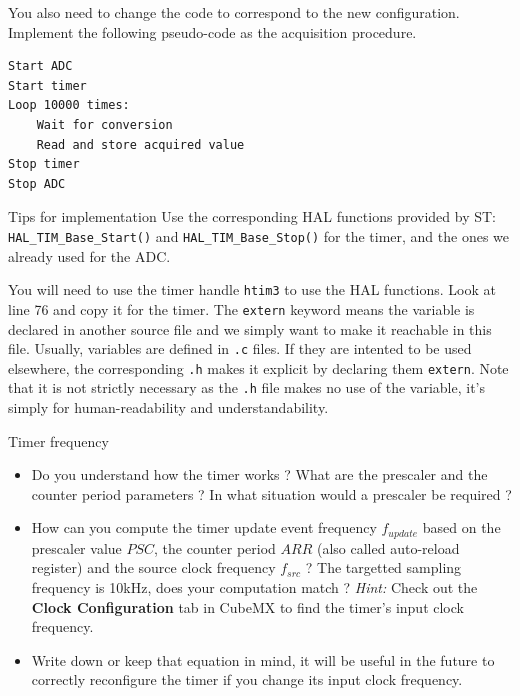 You also need to change the code to correspond to the new configuration. Implement the following pseudo-code as the acquisition procedure.
\begin{lstlisting}[columns=fullflexible]
Start ADC
Start timer
Loop 10000 times:
    Wait for conversion
    Read and store acquired value
Stop timer
Stop ADC
\end{lstlisting}

\begin{bclogo}[couleur = gray!20, arrondi = 0.2, logo=\bcattention]{Tips for implementation}
Use the corresponding HAL functions provided by ST:\\
\texttt{HAL\_TIM\_Base\_Start()} and \texttt{HAL\_TIM\_Base\_Stop()} for the timer, and the ones we already used for the ADC.

You will need to use the timer handle \texttt{htim3} to use the HAL functions. Look at line 76 and copy it for the timer. The \texttt{extern} keyword means the variable is declared in another source file and we simply want to make it reachable in this file. Usually, variables are defined in \texttt{.c} files. If they are intented to be used elsewhere, the corresponding \texttt{.h} makes it explicit by declaring them \texttt{extern}. Note that it is not strictly necessary as the \texttt{.h} file makes no use of the variable, it's simply for human-readability and understandability.
\end{bclogo}

\begin{bclogo}[couleur = gray!20, arrondi = 0.2, logo=\bcquestion]{Timer frequency}
\begin{itemize}
    \item Do you understand how the timer works ? What are the prescaler and the counter period parameters ? In what situation would a prescaler be required ?
    \item How can you compute the timer update event frequency $f_{update}$ based on the prescaler value $PSC$, the counter period $ARR$ (also called auto-reload register) and the source clock frequency $f_{src}$ ? The targetted sampling frequency is 10kHz, does your computation match ? \textit{Hint:} Check out the \textbf{Clock Configuration} tab in CubeMX to find the timer's input clock frequency.
    \item Write down or keep that equation in mind, it will be useful in the future to correctly reconfigure the timer if you change its input clock frequency.
\end{itemize}
\end{bclogo}

